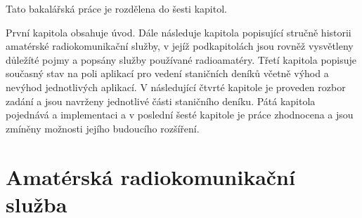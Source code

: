 Tato bakalářská  práce je rozdělena do šesti kapitol.

První kapitola obsahuje úvod. Dále následuje kapitola popisující stručně historii amatérské radiokomunikační služby,
v jejíž podkapitolách jsou rovněž vysvětleny důležíté pojmy a popsány služby používané radioamatéry.
Třetí kapitola popisuje současný stav na poli aplikací pro vedení staničních deníků včetně výhod a nevýhod jednotlivých
aplikací. V následující čtvrté kapitole je proveden rozbor zadání a jsou navrženy jednotlivé části staničního deníku.
Pátá kapitola pojednává a implementaci a v poslední šesté kapitole je práce zhodnocena a jsou zmíněny možnosti jejího
budoucího rozšíření.




\chapter{Amatérská radiokomunikační služba}
\label{radioamateri}

